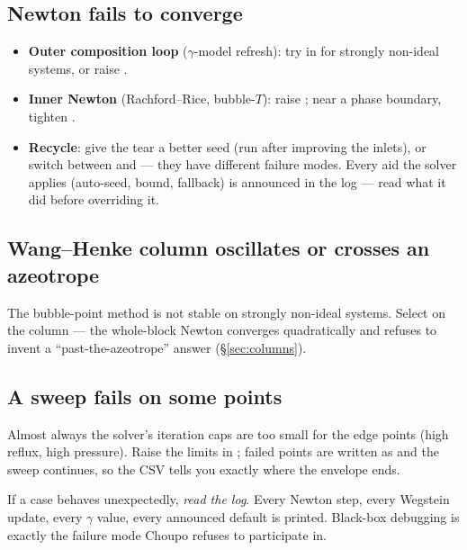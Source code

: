 \documentclass[11pt,a4paper]{article}
\begin{document}
\subsection*{Newton fails to converge}

\begin{itemize}[leftmargin=*]
  \item \textbf{Outer composition loop} ($\gamma$-model refresh): try
         in
         for strongly non-ideal systems, or raise
        .
  \item \textbf{Inner Newton} (Rachford--Rice, bubble-$T$): raise
        ; near a phase boundary, tighten
        .
  \item \textbf{Recycle}: give the tear a better  seed (run
         after improving the inlets), or
        switch  between  and
         --- they have different failure modes.  Every
        aid the solver applies (auto-seed, bound, fallback) is
        announced in the log --- read what it did before overriding it.
\end{itemize}

\subsection*{Wang--Henke column oscillates or crosses an azeotrope}

The bubble-point method is not stable on strongly non-ideal systems.
Select  on the column --- the whole-block
Newton converges quadratically and refuses to invent a
``past-the-azeotrope'' answer (\S\ref{sec:columns}).

\subsection*{A sweep fails on some points}

Almost always the solver's iteration caps are too small for the edge
points (high reflux, high pressure).  Raise the limits in
; failed points are written as  and the
sweep continues, so the CSV tells you exactly where the envelope ends.

\begin{keyidea}
If a case behaves unexpectedly, \emph{read the log}.  Every Newton
step, every Wegstein update, every $\gamma$ value, every announced
default is printed.  Black-box debugging is exactly the failure mode
Choupo refuses to participate in.
\end{keyidea}
\end{document}
